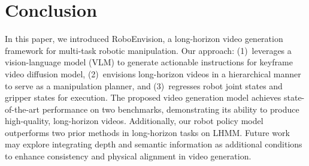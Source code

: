 \documentclass[letterpaper, 10 pt, conference]{ieeeconf}  %
\begin{document}
\section{Conclusion}
In this paper, we introduced {RoboEnvision}, a long-horizon video generation framework for multi-task robotic manipulation. Our approach: (1)~leverages a vision-language model (VLM) to generate actionable instructions for keyframe video diffusion model, (2)~envisions long-horizon videos in a hierarchical manner to serve as a manipulation planner, and (3)~regresses robot joint states and gripper states for execution. The proposed video generation model achieves state-of-the-art performance on two benchmarks, demonstrating its ability to produce high-quality, long-horizon videos. Additionally, our robot policy model outperforms two prior methods in long-horizon tasks on LHMM. Future work may explore integrating depth and semantic information as additional conditions to enhance consistency and physical alignment in video generation.












\end{document}
